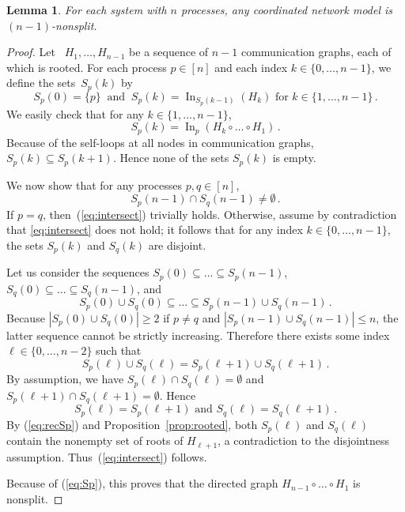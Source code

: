 \documentclass[a4paper]{article}
\theoremstyle{newthm}
\newtheorem{lem}[thm]{Lemma}
\renewcommand{\leq}{\leqslant}
\renewcommand{\ge}{\geqslant}
\DeclareMathOperator\In{In}
\begin{document}
\begin{lem}\label{lem:productrooted}
For each system with $n$ processes, any coordinated network model  is $(n-1)$-nonsplit.
\end{lem}

\begin{proof}
Let ~$H_1, \dots, H_{n-1}$ be a sequence of $n-1$ communication graphs,
	each of which is rooted.
For each process $p \in [n]$ and each index $ k \in \{0, \dots, n-1\}$,  we define the sets~$S_p(k)$ by  
	\begin{equation}\label{eq:recSp}
         S_p(0) = \{ p \} \ \text{ and } \ 
         S_p(k) = \In_{S_p(k-1)}  (H_k )   \text{ for } k \in \{1, \dots, n-1\} \,.
         \end{equation}
We easily check that for any $k \in \{1, \dots, n-1\} $, 
	\begin{equation}\label{eq:Sp}
         S_p(k) = \In_p(H_k \circ \dots \circ H_1 ) \, .
         \end{equation}
Because of the self-loops at all nodes in communication graphs,
	 $S_p(k) \subseteq S_p(k+1) $.
Hence none of the sets $S_p(k)$ is empty. 

We now show that for any processes $p,q \in [n]$,
\begin{equation}\label{eq:intersect}
S_p(n-1) \cap S_q(n-1) \neq \emptyset \,.
\end{equation}
If $p=q$, then~(\ref{eq:intersect}) trivially holds.
Otherwise, assume by contradiction that \eqref{eq:intersect} does not hold;
	it follows that for any index $k  \in \{ 0, \dots, n-1\}$, the sets $S_p(k)$ and  $S_q(k)$ are disjoint.
	
Let us consider the  sequences $ S_p(0) \subseteq \dots  \subseteq S_p(n -1)$,
	$S_q(0) \subseteq  \dots  \subseteq S_q( n -1) $, and 
	$$ S_p(0) \cup S_q (0) \subseteq  \dots  \subseteq S_p( n -1) \cup S_q( n -1) \, .$$
Because  $ |S_p(0) \cup S_q(0)| \ge 2 $ if $p\neq q$ and
	  $ |S_p(n-1) \cup S_q( n-1)| \leq  n $, the latter sequence cannot be strictly
	increasing.
Therefore there exists some index $\ell   \in \{ 0, \dots, n-2\}$
	such that $$ S_p(\ell   ) \cup S_q( \ell  ) = S_p(\ell   +1) \cup S_q(\ell   +1)\, .$$
By assumption, we have  $S_p( \ell   ) \cap S_q( \ell   ) = \emptyset$ and $S_p(\ell   +1 ) \cap S_q( \ell   +1 ) = \emptyset$.
Hence $$ S_p(\ell   ) = S_p(\ell   +1) \mbox{ and }  S_q( \ell  )  = S_q(\ell   +1)\, .$$
By (\ref{eq:recSp}) and Proposition~\ref{prop:rooted}, both $S_p(\ell   ) $ and $ S_q( \ell  )$ contain the
       nonempty set of  roots of $H_{\ell   +1}$, a contradiction to the disjointness assumption. 
Thus~(\ref{eq:intersect}) follows. 

\noindent Because of (\ref{eq:Sp}), this proves that the directed graph $ H_{n-1} \circ \dots \circ H_1  $ is nonsplit.
\end{proof}
\end{document}
